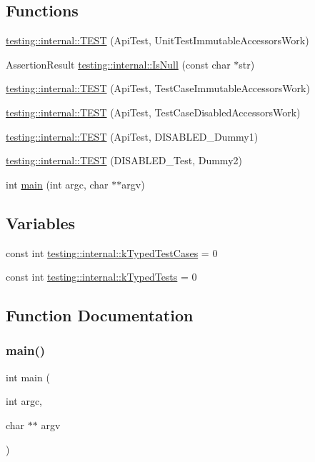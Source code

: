 \subsection*{Functions}
\begin{DoxyCompactItemize}
\item 
\hyperlink{namespacetesting_1_1internal_a9ac879683abb06d1c0bba3a339ea2f40}{testing\+::internal\+::\+T\+E\+ST} (Api\+Test, Unit\+Test\+Immutable\+Accessors\+Work)
\item 
Assertion\+Result \hyperlink{namespacetesting_1_1internal_adcfd37a66bc4cb0e8291cf46e1a6c72b}{testing\+::internal\+::\+Is\+Null} (const char $\ast$str)
\item 
\hyperlink{namespacetesting_1_1internal_a33809333fe5b5f33c2bd56ddcdd1dbb6}{testing\+::internal\+::\+T\+E\+ST} (Api\+Test, Test\+Case\+Immutable\+Accessors\+Work)
\item 
\hyperlink{namespacetesting_1_1internal_a459d693357db8f8f48c26a8bee3ffb84}{testing\+::internal\+::\+T\+E\+ST} (Api\+Test, Test\+Case\+Disabled\+Accessors\+Work)
\item 
\hyperlink{namespacetesting_1_1internal_a9ed5f89c92532506899e3908e79af4de}{testing\+::internal\+::\+T\+E\+ST} (Api\+Test, D\+I\+S\+A\+B\+L\+E\+D\+\_\+\+Dummy1)
\item 
\hyperlink{namespacetesting_1_1internal_a4a84433419426d1c1b87ce998267b0d4}{testing\+::internal\+::\+T\+E\+ST} (D\+I\+S\+A\+B\+L\+E\+D\+\_\+\+Test, Dummy2)
\item 
int \hyperlink{gtest-unittest-api__test_8cc_a3c04138a5bfe5d72780bb7e82a18e627}{main} (int argc, char $\ast$$\ast$argv)
\end{DoxyCompactItemize}
\subsection*{Variables}
\begin{DoxyCompactItemize}
\item 
const int \hyperlink{namespacetesting_1_1internal_a685ea5332074ae63b0ded2b184ac2271}{testing\+::internal\+::k\+Typed\+Test\+Cases} = 0
\item 
const int \hyperlink{namespacetesting_1_1internal_a53ee2d113744f9ba1d89469db4d7388b}{testing\+::internal\+::k\+Typed\+Tests} = 0
\end{DoxyCompactItemize}


\subsection{Function Documentation}
\mbox{\label{gtest-unittest-api__test_8cc_a3c04138a5bfe5d72780bb7e82a18e627}} 
\subsubsection{\texorpdfstring{main()}{main()}}
{\footnotesize\ttfamily int main (\begin{DoxyParamCaption}\item[{int}]{argc,  }\item[{char $\ast$$\ast$}]{argv }\end{DoxyParamCaption})}

